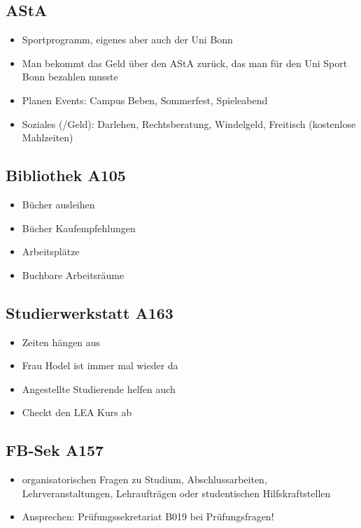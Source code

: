 \documentclass[11pt,ngerman]{scrartcl}
\begin{document}
\subsection*{AStA}
\begin{itemize}
    \item Sportprogramm, eigenes aber auch der Uni Bonn
    \item Man bekommt das Geld über den AStA zurück, das man für den Uni Sport Bonn bezahlen musste
    \item Planen Events: Campus Beben, Sommerfest, Spieleabend
    \item Soziales (/Geld): Darlehen, Rechtsberatung, Windelgeld, Freitisch (kostenlose Mahlzeiten)
\end{itemize}

\subsection*{Bibliothek A105}
\begin{itemize}
    \item Bücher ausleihen
    \item Bücher Kaufempfehlungen
    \item Arbeitsplätze
    \item Buchbare Arbeitsräume
\end{itemize}

\subsection*{Studierwerkstatt A163}
\begin{itemize}
    \item Zeiten hängen aus
    \item Frau Hodel ist immer mal wieder da
    \item Angestellte Studierende helfen auch
    \item Checkt den LEA Kurs ab
\end{itemize}

\subsection*{FB-Sek A157}
\begin{itemize}
    \item organisatorischen Fragen zu Studium, Abschlussarbeiten, Lehrveranstaltungen, Lehraufträgen oder studentischen Hilfskraftstellen
    \item Ansprechen: Prüfungssekretariat B019 bei Prüfungsfragen!
\end{itemize}
\end{document}
